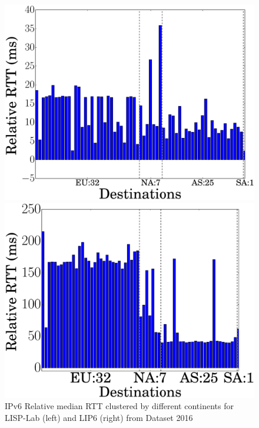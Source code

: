 \begin{figure}[!t]
	\begin{minipage}[c]{.49\linewidth}
		\begin{center}
			\includegraphics[width=\textwidth]{Pics/v6/Relative_median_avg(RTT)_LISP-Lab-FranceIX.eps}
		\end{center}
	\end{minipage}
	\begin{minipage}[c]{.49\linewidth}
		\begin{center}
			\includegraphics[width=\textwidth]{Pics/v6/Relative_median_avg(RTT)_LIP6-FranceIX_changed_60.eps}
		\end{center}
	\end{minipage}
	\vspace{-0.5mm}
	\caption{IPv6 Relative median RTT clustered by different continents for LISP-Lab (left) and LIP6 (right) from Dataset 2016}
	\label{Relative_median_avg(RTT)_v6_2016}
\end{figure}
